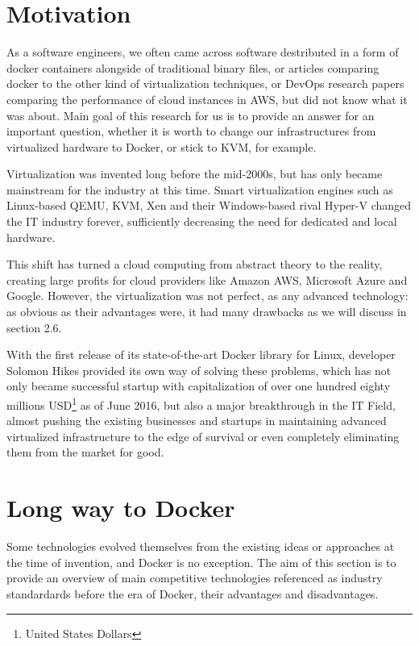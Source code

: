 
\section{Motivation}

As a software engineers,
we often came across software destributed
in a form of docker containers alongside
of traditional binary files,
or articles comparing docker to the other kind of virtualization techniques,
or DevOps research papers comparing the performance of cloud instances in AWS,
but did not know what it was about.
Main goal of this research for us is to provide an answer
for an important question, whether it is worth
to change our infrastructures
from virtualized hardware to Docker, or stick to KVM, for example.

Virtualization was invented long before the mid-2000s,
but has only became mainstream for the industry at this time.
Smart virtualization engines such as Linux-based QEMU, KVM, Xen
and their Windows-based rival Hyper-V changed the IT industry forever,
sufficiently decreasing the need for dedicated and local hardware.

This shift has turned a cloud computing from abstract theory to the reality,
creating large profits for cloud providers like Amazon AWS,
Microsoft Azure and Google.
However, the virtualization was not perfect, as any advanced technology:
as obvious as their advantages were, it had many
drawbacks as we will discuss in section 2.6.

With the first release of its state-of-the-art Docker library for Linux,
developer Solomon Hikes provided its own way of solving these problems,
which has not only became successful startup
with capitalization of over one hundred eighty millions
USD\footnote{United States Dollars} as of June 2016\cite{DockerCapitalization},
but also a major breakthrough in the IT Field, almost pushing the existing
businesses and startups in maintaining advanced virtualized infrastructure
to the edge of survival or even completely eliminating
them from the market for good\cite{DockerImpact}.

\section{Long way to Docker}

Some technologies evolved themselves from the existing ideas
or approaches at the time of invention, and Docker is no exception.
The aim of this section is to provide an overview of main competitive
technologies referenced as industry standardards
before the era of Docker, their advantages and disadvantages.

